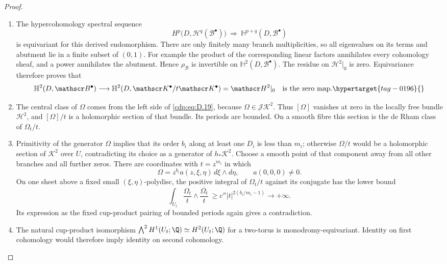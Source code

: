 \begin{proof}
\begin{enumerate}[leftmargin=*]
\item The hypercohomology spectral sequence
\[
 H^p\bigl(D,\mathcal H^q(\mathscr B^\bullet)\bigr)
 \ \Longrightarrow\ \mathbb H^{p+q}(D,\mathscr B^\bullet)
\]
is equivariant for this derived endomorphism. There are only
finitely many branch multiplicities, so all eigenvalues on its
terms and abutment lie in a finite subset of $(0,1)$. For
example the product of the corresponding linear factors
annihilates every cohomology sheaf, and a power annihilates the
abutment. Hence $\rho_{\mathscr B}$ is invertible on
$\mathbb H^2(D,\mathscr B^\bullet)$. The residue on
$\mathscr H^2|_0$ is zero. Equivariance therefore proves that
\begin{equation}
 \mathbb H^2(D,\mathscr B^\bullet)\longrightarrow
 \mathbb H^2(D,\mathscr K^\bullet/t\mathscr K^\bullet)
       =\mathscr H^2|_0
 \quad\hbox{is the zero map}.
\hypertarget{tag-0196}{}\label{cdp:eq:D.19}
\end{equation}

\item The central class of $\Omega$ comes from the left side of
\eqref{cdp:eq:D.19}, because $\Omega\in\mathscr J\mathscr K^2$.
Thus $[\Omega]$ vanishes at zero in the locally free bundle
$\mathscr H^2$, and $[\Omega]/t$ is a holomorphic section of
that bundle. Its periods are bounded. On a smooth fibre this
section is the de Rham class of $\Omega_t/t$.

\item Primitivity of the generator $\Omega$ implies that its order
$b_i$ along at least one $D_i$ is less than $m_i$; otherwise
$\Omega/t$ would be a holomorphic section of $\mathscr K^2$
over $U$, contradicting its choice as a generator of
$h_*\mathscr K^2$. Choose a smooth point of that component
away from all other branches and all further zeros. There
are coordinates with $t=z^{m_i}$ in which
\[
 \Omega=z^{b_i}a(z,\xi,\eta)\,d\xi\wedge d\eta,
 \qquad a(0,0,0)\ne0.
\]
On one sheet above a fixed small $(\xi,\eta)$-polydisc, the
positive integral of $\Omega_t/t$ against its conjugate has
the lower bound
\[
 \int_{U_t}\frac{\Omega_t}{t}\wedge
                    \overline{\frac{\Omega_t}{t}}
 \ \ge c''|t|^{2(b_i/m_i-1)}\longrightarrow+\infty.
\]
Its expression as the fixed cup-product pairing of bounded
periods again gives a contradiction.

\item The natural
cup-product isomorphism
$\bigwedge^2H^1(U_t;\Q)\simeq H^2(U_t;\Q)$ for a two-torus
is monodromy-equivariant. Identity on first cohomology would
therefore imply identity on second cohomology.

\end{enumerate}
\end{proof}